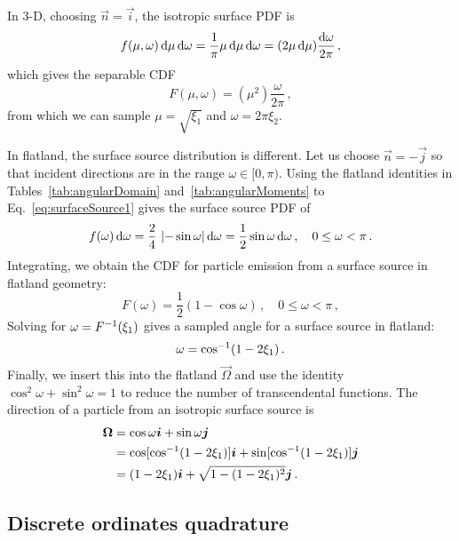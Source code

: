 In 3-D, choosing $\vec{n}=\vec{i}$, the isotropic surface PDF is
\begin{equation*}
  f(\mu,\omega) \mathop{}\!\mathrm{d}\mu \mathop{}\!\mathrm{d}\omega
  = \frac{1}{\pi} \mu \mathop{}\!\mathrm{d}\mu \mathop{}\!\mathrm{d}\omega
  = (2 \mu \mathop{}\!\mathrm{d}\mu) \frac{\mathop{}\!\mathrm{d}\omega}{2\pi}\,,
\end{equation*}
which gives the separable CDF
\begin{equation*}
  F(\mu,\omega) = (\mu^2) \frac{\omega}{2\pi}\,,
\end{equation*}
from which we can sample $\mu=\sqrt{\xi_1}$ and $\omega=2\pi \xi_2$.

In flatland, the surface source distribution is different. Let us choose
$\vec{n} = -\vec{j}$ so that incident directions are in the range
$\omega \in [0, \pi)$.
Using the flatland identities in Tables~\ref{tab:angularDomain}
and~\ref{tab:angularMoments} to Eq.~\eqref{eq:surfaceSource1} gives the surface
source PDF of
\begin{equation*}
  f(\omega) \mathop{}\!\mathrm{d}\omega = \frac{2}{4} \, \left|  -\sin \omega \right|\mathop{}\!\mathrm{d}\omega
  = \frac{1}{2} \sin \omega\mathop{}\!\mathrm{d}\omega \,,\quad 0 \le \omega < \pi\,.
\end{equation*}
Integrating, we obtain the CDF for particle emission from
a surface source in flatland geometry:
\begin{equation}\label{eq:surfaceSourceFlatland}
  F(\omega) = \frac{1}{2} \left( 1-\cos\omega \right)
  \,,\quad 0 \le \omega < \pi\,,
\end{equation}
Solving for $\omega = F^{-1}(\xi_1)$ gives a sampled angle for a surface source
in flatland:
\begin{equation*}
  \omega = \cos^{-1}(1 - 2\xi_1)\,.
\end{equation*}
Finally, we insert this into the flatland $\vec{\Omega}$ and use the identity
$\cos^2 \omega + \sin^2 \omega = 1$ to reduce the number of transcendental
functions. The direction of a particle from an isotropic surface source is
\begin{align*}
  \bm{\Omega} &= \cos \omega \bm{i} + \sin \omega \bm{j} \\
  &=  \cos[ \cos^{-1}(1 - 2\xi_1) ] \bm{i} + \sin[ \cos^{-1}(1 - 2\xi_1) ] \bm{j} \\
  &= (1 - 2\xi_1) \bm{i} + \sqrt{1 - (1 - 2\xi_1)^2} \bm{j}\,.
\end{align*}

\subsection{Discrete ordinates quadrature}

